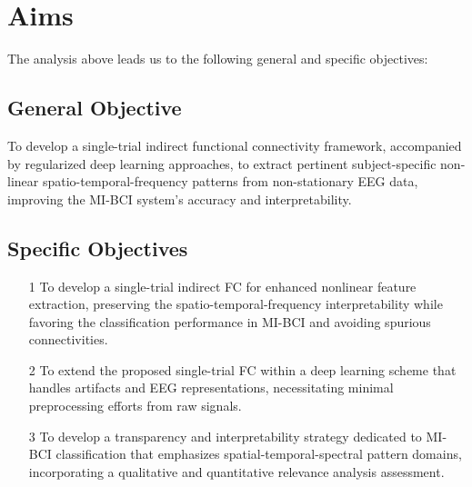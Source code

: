 \chapter{Aims}

The analysis above leads us to the following general and specific objectives:

\section{General Objective}

To develop a single-trial indirect functional connectivity framework, accompanied by regularized deep learning approaches, to extract pertinent subject-specific non-linear spatio-temporal-frequency patterns from non-stationary EEG data, improving the MI-BCI system's accuracy and interpretability.

\section{Specific Objectives}

\begin{itemize}
	\item[1] To develop a single-trial indirect FC for enhanced nonlinear feature extraction, preserving the spatio-temporal-frequency interpretability while favoring the classification performance in MI-BCI and avoiding spurious connectivities.
 
	\item[2] To extend the proposed single-trial FC within a deep learning scheme that handles artifacts and EEG representations, necessitating minimal preprocessing efforts from raw signals.
 
	\item[3] To develop a transparency and interpretability strategy dedicated to MI-BCI classification that emphasizes spatial-temporal-spectral pattern domains, incorporating a qualitative and quantitative relevance analysis assessment.
\end{itemize}
